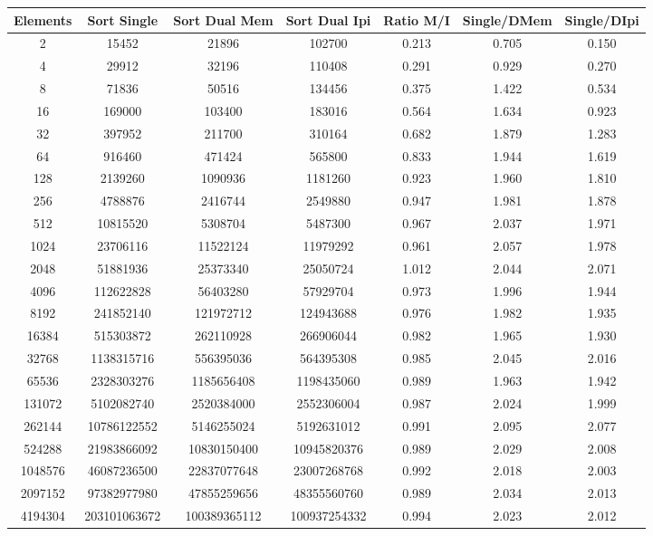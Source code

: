 \begin{center}
	\begin{tabular}{|c|c|c|c|c|c|c|}
		\hline	
			Elements & Sort Single & Sort Dual Mem & Sort Dual Ipi & Ratio M/I & Single/DMem & Single/DIpi\\
		\hline
			2 & 15452 & 21896 & 102700 & 0.213 & 0.705 & 0.150\\
		\hline
			4 & 29912 & 32196 & 110408 & 0.291 & 0.929 & 0.270\\
		\hline
			8 & 71836 & 50516 & 134456 & 0.375 & 1.422 & 0.534\\
		\hline
			16 & 169000 & 103400 & 183016 & 0.564 & 1.634 & 0.923\\
		\hline
			32 & 397952 & 211700 & 310164 & 0.682 & 1.879 & 1.283\\
		\hline
			64 & 916460 & 471424 & 565800 & 0.833 & 1.944 & 1.619\\
		\hline
			128 & 2139260 & 1090936 & 1181260 & 0.923 & 1.960 & 1.810\\
		\hline
			256 & 4788876 & 2416744 & 2549880 & 0.947 & 1.981 & 1.878\\
		\hline
			512 & 10815520 & 5308704 & 5487300 & 0.967 & 2.037 & 1.971\\
		\hline
			1024 & 23706116 & 11522124 & 11979292 & 0.961 & 2.057 & 1.978\\
		\hline
			2048 & 51881936 & 25373340 & 25050724 & 1.012 & 2.044 & 2.071\\
		\hline
			4096 & 112622828 & 56403280 & 57929704 & 0.973 & 1.996 & 1.944\\
		\hline
			8192 & 241852140 & 121972712 & 124943688 & 0.976 & 1.982 & 1.935\\
		\hline
			16384 & 515303872 & 262110928 & 266906044 & 0.982 & 1.965 & 1.930\\
		\hline
			32768 & 1138315716 & 556395036 & 564395308 & 0.985 & 2.045 & 2.016\\
		\hline
			65536 & 2328303276 & 1185656408 & 1198435060 & 0.989 & 1.963 & 1.942\\
		\hline
			131072 & 5102082740 & 2520384000 & 2552306004 & 0.987 & 2.024 & 1.999\\
		\hline
			262144 & 10786122552 & 5146255024 & 5192631012 & 0.991 & 2.095 & 2.077\\
		\hline
			524288 & 21983866092 & 10830150400 & 10945820376 & 0.989 & 2.029 & 2.008\\
		\hline
			1048576 & 46087236500 & 22837077648 & 23007268768 & 0.992 & 2.018 & 2.003\\
		\hline
			2097152 & 97382977980 & 47855259656 & 48355560760 & 0.989 & 2.034 & 2.013\\
		\hline
			4194304 & 203101063672 & 100389365112 & 100937254332 & 0.994 & 2.023 & 2.012\\
		\hline
	\end{tabular}
\end{center}


